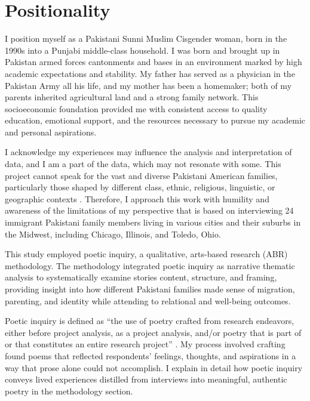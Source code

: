 \section{Positionality}

I position myself as a Pakistani Sunni Muslim Cisgender woman, born in the 1990s into a Punjabi middle-class household. I was born and brought up in Pakistan armed forces cantonments and bases in an environment marked by high academic expectations and stability. My father has served as a physician in the Pakistan Army all his life, and my mother has been a homemaker; both of my parents inherited agricultural land and a strong family network. This socioeconomic foundation provided me with consistent access to quality education, emotional support, and the resources necessary to pursue my academic and personal aspirations. 

I acknowledge my experiences may influence the analysis and interpretation of data, and I am a part of the data, which may not resonate with some. This project cannot speak for the vast and diverse Pakistani American families, particularly those shaped by different class, ethnic, religious, linguistic, or geographic contexts \citep{farooqPoeticAutoethnographyPath2025a}. Therefore, I approach this work with humility and awareness of the limitations of my perspective that is based on interviewing 24 immigrant Pakistani family members living in various cities and their suburbs in the Midwest, including Chicago, Illinois, and Toledo, Ohio. 

This study employed poetic inquiry, a qualitative, arts-based research (ABR) methodology. The methodology integrated poetic inquiry as narrative thematic analysis to systematically examine stories content, structure, and framing, providing insight into how different Pakistani families made sense of migration, parenting, and identity while attending to relational and well-being outcomes. 

Poetic inquiry is defined as “the use of poetry crafted from research endeavors, either before project analysis, as a project analysis, and/or poetry that is part of or that constitutes an entire research project” \citep[p.~210]{faulknerPoeticInquiryCraft2019}. My process involved crafting found poems that reflected respondents’ feelings, thoughts, and aspirations in a way that prose alone could not accomplish. I explain in detail how poetic inquiry conveys lived experiences distilled from interviews into meaningful, authentic poetry in the methodology section.

